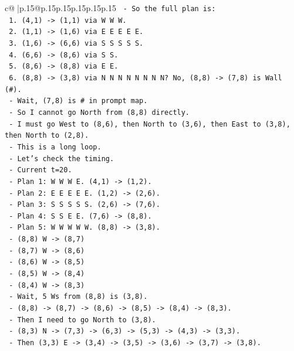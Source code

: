 \documentclass{article}
\begin{document}
{\begin{supertabular}{c@{$\;$}|p{.15\linewidth}@{}p{.15\linewidth}p{.15\linewidth}p{.15\linewidth}p{.15\linewidth}p{.15\linewidth}}
{{{\texttt{   {-} So the full plan is:} \\
\texttt{     1. (4,1) {-}> (1,1) via W W W.} \\
\texttt{     2. (1,1) {-}> (1,6) via E E E E E.} \\
\texttt{     3. (1,6) {-}> (6,6) via S S S S S.} \\
\texttt{     4. (6,6) {-}> (8,6) via S S.} \\
\texttt{     5. (8,6) {-}> (8,8) via E E.} \\
\texttt{     6. (8,8) {-}> (3,8) via N N N N N N N N? No, (8,8) {-}> (7,8) is Wall (\#).} \\
\texttt{     {-} Wait, (7,8) is \# in prompt map.} \\
\texttt{     {-} So I cannot go North from (8,8) directly.} \\
\texttt{     {-} I must go West to (8,6), then North to (3,6), then East to (3,8), then North to (2,8).} \\
\texttt{     {-} This is a long loop.} \\
\texttt{     {-} Let's check the timing.} \\
\texttt{     {-} Current t=20.} \\
\texttt{     {-} Plan 1: W W W E. (4,1) {-}> (1,2).} \\
\texttt{     {-} Plan 2: E E E E E. (1,2) {-}> (2,6).} \\
\texttt{     {-} Plan 3: S S S S S. (2,6) {-}> (7,6).} \\
\texttt{     {-} Plan 4: S S E E. (7,6) {-}> (8,8).} \\
\texttt{     {-} Plan 5: W W W W W. (8,8) {-}> (3,8).} \\
\texttt{       {-} (8,8) W {-}> (8,7)} \\
\texttt{       {-} (8,7) W {-}> (8,6)} \\
\texttt{       {-} (8,6) W {-}> (8,5)} \\
\texttt{       {-} (8,5) W {-}> (8,4)} \\
\texttt{       {-} (8,4) W {-}> (8,3)} \\
\texttt{       {-} Wait, 5 Ws from (8,8) is (3,8).} \\
\texttt{       {-} (8,8) {-}> (8,7) {-}> (8,6) {-}> (8,5) {-}> (8,4) {-}> (8,3).} \\
\texttt{       {-} Then I need to go North to (3,8).} \\
\texttt{       {-} (8,3) N {-}> (7,3) {-}> (6,3) {-}> (5,3) {-}> (4,3) {-}> (3,3).} \\
\texttt{       {-} Then (3,3) E {-}> (3,4) {-}> (3,5) {-}> (3,6) {-}> (3,7) {-}> (3,8).} \\
}}}
\end{supertabular}}
\end{document}
